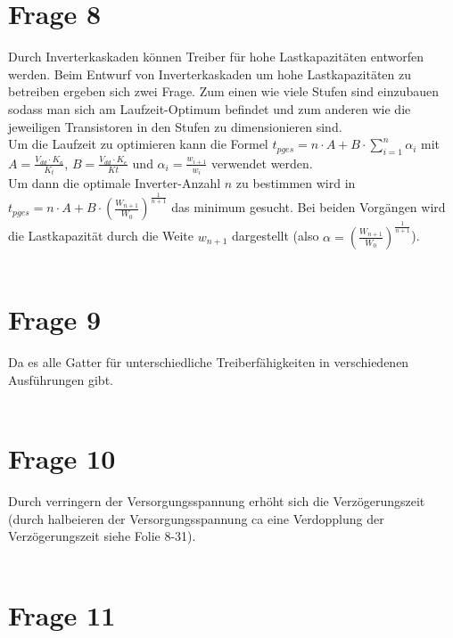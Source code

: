 \documentclass[a4paper]{scrartcl}
\begin{document}
\section*{Frage 8}
Durch Inverterkaskaden können Treiber für hohe Lastkapazitäten entworfen werden. Beim Entwurf von Inverterkaskaden um hohe Lastkapazitäten zu betreiben ergeben sich zwei Frage. Zum einen wie viele Stufen sind einzubauen sodass man sich am Laufzeit-Optimum befindet und zum anderen wie die jeweiligen Transistoren in den Stufen zu dimensionieren sind.\\
Um die Laufzeit zu optimieren kann die Formel $t_{pges} = n \cdot A + B \cdot \sum_{i=1}^n \alpha_i$ mit $A = \frac{V_{dd} \cdot K_a}{K_t}$, $B = \frac{V_{dd} \cdot K_e}{Kt}$ und $\alpha_i = \frac{w_{i+1}}{w_i}$ verwendet werden.\\
Um dann die optimale Inverter-Anzahl $n$ zu bestimmen wird in $t_{pges} = n \cdot A + B \cdot (\frac{W_{n+1}}{W_0})^{\frac{1}{n+1}} $ das minimum gesucht.
Bei beiden Vorgängen wird die Lastkapazität durch die Weite $w_{n+1}$ dargestellt (also $\alpha = (\frac{W_{n+1}}{W_0})^{\frac{1}{n+1}}$).
~\\
~\\
\section*{Frage 9}
Da es alle Gatter für unterschiedliche Treiberfähigkeiten in verschiedenen Ausführungen gibt.
~\\
~\\
\section*{Frage 10}
Durch verringern der Versorgungsspannung erhöht sich die Verzögerungszeit (durch halbeieren der Versorgungsspannung ca eine Verdopplung der Verzögerungszeit siehe Folie 8-31).
~\\
~\\
\section*{Frage 11}

~\\
~\\
\end{document}
